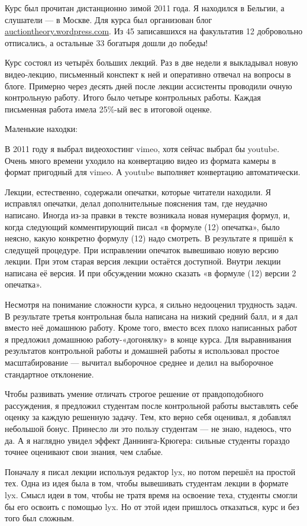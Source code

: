 \documentclass[11pt, openany]{book}
\numberwithin{equation}{page} %
\theoremstyle{definition} %
\theoremstyle{definition}
\theoremstyle{definition}
\begin{document}
Курс был прочитан дистанционно зимой 2011 года. Я находился в Бельгии, а слушатели — в Москве. Для курса был организован блог \url{auctiontheory.wordpress.com}. Из 45 записавшихся на факультатив 12 добровольно отписались, а остальные 33 богатыря дошли до победы!

Курс состоял из четырёх больших лекций. Раз в две недели я выкладывал новую видео-лекцию, письменный конспект к ней и оперативно отвечал на вопросы в блоге. Примерно через десять дней после лекции ассистенты проводили очную контрольную работу. Итого было четыре контрольных работы. Каждая письменная работа имела 25\%-ый вес в итоговой оценке.

Маленькие находки:

В 2011 году я выбрал видеохостинг vimeo, хотя сейчас выбрал бы youtube. Очень много времени уходило на конвертацию видео из формата камеры в формат пригодный для vimeo. А youtube выполняет конвертацию автоматически.

Лекции, естественно, содержали опечатки, которые читатели находили. Я исправлял опечатки, делал дополнительные пояснения там, где неудачно написано. Иногда из-за правки в тексте возникала новая нумерация формул, и, когда следующий комментирующий писал «в формуле (12) опечатка», было неясно, какую конкретно формулу (12) надо смотреть. В результате я пришёл к следущей процедуре. При исправлении опечаток вывешиваю новую версию лекции. При этом старая версия лекции остаётся доступной. Внутри лекции написана её версия. И при обсуждении можно сказать «в формуле (12) версии 2 опечатка».

Несмотря на понимание сложности курса, я сильно недооценил трудность задач. В результате третья контрольная была написана на низкий средний балл, и я дал вместо неё домашнюю работу. Кроме того, вместо всех плохо написанных работ я предложил домашнюю работу-«догонялку» в конце курса. Для выравнивания результатов контрольной работы и домашней работы я использовал простое масштабирование — вычитал выборочное среднее и делил на выборочное стандартное отклонение.

Чтобы развивать умение отличать строгое решение от правдоподобного рассуждения, я предложил студентам после контрольной работы выставлять себе оценку за каждую решенную задачу. Тем, кто верно себя оценивал, я добавлял небольшой бонус. Принесло ли это пользу студентам — не знаю, надеюсь, что да. А я наглядно увидел эффект Даннинга-Крюгера: сильные студенты гораздо точнее оценивают свои знания, чем слабые.

Поначалу я писал лекции используя редактор lyx, но потом перешёл на простой тех. Одна из идея была в том, чтобы вывешивать студентам лекции в формате lyx. Смысл идеи в том, чтобы не тратя время на освоение теха, студенты смогли бы его освоить с помощью lyx. Но от этой идеи пришлось отказаться, курс и без того был сложным.
\end{document}
